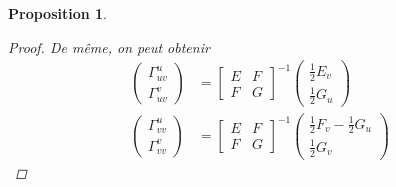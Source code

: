 \documentclass{report}
\newtheorem*{prop}{Proposition}
\theoremstyle{definition}
\theoremstyle{remark}
\begin{document}
\begin{prop}
\begin{proof}
			De m\^eme, on peut obtenir
			\begin{align*}
				\begin{pmatrix}
					\Gamma_{uv}^u\\\Gamma_{uv}^v
				\end{pmatrix}&= \begin{bmatrix}
					E&F\\F&G
				\end{bmatrix}^{-1} \begin{pmatrix}
					\frac{1}{2}E_v\\\frac{1}{2}G_u
				\end{pmatrix}\\
				\begin{pmatrix}
					\Gamma_{vv}^u\\\Gamma_{vv}^v
				\end{pmatrix}&= \begin{bmatrix}
					E&F\\F&G
				\end{bmatrix}^{-1} \begin{pmatrix}
					\frac{1}{2}F_v-\frac{1}{2}G_u\\\frac{1}{2}G_v
				\end{pmatrix}
			\end{align*}
		\end{proof}
	\end{prop}
\end{document}
